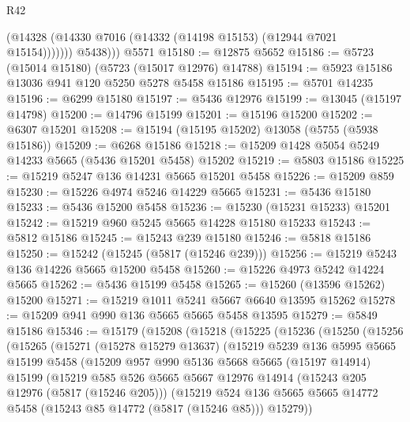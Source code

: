 \begin{lexlean}{R42}
\begin{coremodule}
              (@14328 (@14330 @7016 (@14332 (@14198 @15153) (@12944 @7021 @15154)))))))
          @5438)))
    @5571
@15180 := @12875 @5652
@15186 := @5723 (@15014 @15180) (@5723 (@15017 @12976) @14788)
@15194 := @5923 @15186 @13036 @941 @120 @5250 @5278 @5458 @15186
@15195 := @5701 @14235
@15196 := @6299 @15180
@15197 := @5436 @12976
@15199 := @13045 (@15197 @14798)
@15200 := @14796 @15199
@15201 := @15196 @15200
@15202 := @6307 @15201
@15208 := @15194 (@15195 @15202) @13058 (@5755 (@5938 @15186))
@15209 := @6268 @15186
@15218 := @15209 @1428 @5054 @5249 @14233 @5665 (@5436 @15201 @5458) @15202
@15219 := @5803 @15186
@15225 := @15219 @5247 @136 @14231 @5665 @15201 @5458
@15226 := @15209 @859
@15230 := @15226 @4974 @5246 @14229 @5665
@15231 := @5436 @15180
@15233 := @5436 @15200 @5458
@15236 := @15230 (@15231 @15233) @15201
@15242 := @15219 @960 @5245 @5665 @14228 @15180 @15233
@15243 := @5812 @15186
@15245 := @15243 @239 @15180
@15246 := @5818 @15186
@15250 := @15242 (@15245 (@5817 (@15246 @239)))
@15256 := @15219 @5243 @136 @14226 @5665 @15200 @5458
@15260 := @15226 @4973 @5242 @14224 @5665
@15262 := @5436 @15199 @5458
@15265 := @15260 (@13596 @15262) @15200
@15271 := @15219 @1011 @5241 @5667 @6640 @13595 @15262
@15278 := @15209 @941 @990 @136 @5665 @5665 @5458 @13595
@15279 := @5849 @15186
@15346 := @15179
    (@15208
      (@15218
        (@15225
          (@15236
            (@15250
              (@15256
                (@15265
                  (@15271
                    (@15278 @15279 @13637)
                    (@15219
                      @5239
                      @136
                      @5995
                      @5665
                      @15199
                      @5458
                      (@15209
                        @957
                        @990
                        @5136
                        @5668
                        @5665
                        (@15197 @14914)
                        @15199
                        (@15219
                          @585
                          @526
                          @5665
                          @5667
                          @12976
                          @14914
                          (@15243 @205 @12976 (@5817 (@15246 @205)))
                          (@15219
                            @524
                            @136
                            @5665
                            @5665
                            @14772
                            @5458
                            (@15243 @85 @14772 (@5817 (@15246 @85)))
                            @15279))

\end{coremodule}
\end{lexlean}
